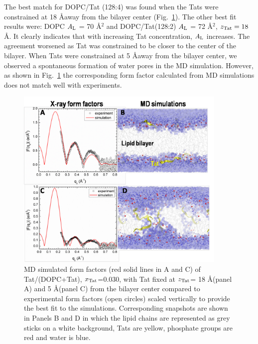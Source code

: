 
The best match for DOPC/Tat (128:4) was found when the Tats were 
constrained at 18 \AA away from the bilayer center (Fig.~\ref{fig:figure4}). The other 
best fit results were: DOPC $A_\textrm{L}$ = 70 \AA$^2$ and DOPC/Tat(128:2) $A_\textrm{L}$ = 72 
\AA$^2$, $z_\textrm{Tat} = 18$ \AA. It clearly indicates that with increasing Tat
concentration, $A_\textrm{L}$ increases. The agreement worsened as Tat was constrained 
to be closer to the
center of the bilayer. When Tats were constrained at 5 \AA away from the bilayer 
center, we
observed a spontaneous formation of water pores in the MD simulation. However, 
as shown in
Fig.~\ref{fig:figure4} the corresponding form factor calculated from MD simulations does not 
match well
with experiments.

\begin{figure}[htbp]
  \centering
  \includegraphics[width=0.9\textwidth]{figures/Tat/figure4}
  \caption{MD simulated form factors (red solid lines in A and C) of Tat/(DOPC+Tat), $x_\textrm{Tat}$=0.030,
  with Tat fixed at $z_\textrm{Tat}$= 18 \AA (panel A) and 5 \AA (panel C) from the bilayer center compared to
  experimental form factors (open circles) scaled vertically to provide the best fit to the
  simulations. Corresponding snapshots are shown in Panels B and D in which the lipid chains are
  represented as grey sticks on a white background, Tats are yellow, phosphate groups are red and
  water is blue.}
  \label{fig:figure4}
\end{figure}

